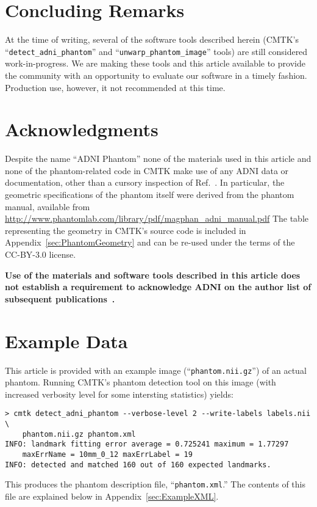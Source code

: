 \documentclass{InsightArticle}
\begin{document}
\section{Concluding Remarks}

At the time of writing, several of the software tools described herein (CMTK's
``\texttt{detect\_adni\_phantom}'' and ``\texttt{unwarp\_phantom\_image}''
tools) are still considered work-in-progress. We are making these tools and
this article available to provide the community with an opportunity to
evaluate our software in a timely fashion. Production use, however, it not
recommended at this time.

\section*{Acknowledgments}

Despite the name ``ADNI Phantom'' none of the materials used in this article
and none of the phantom-related code in CMTK make use of any ADNI data or
documentation, other than a cursory inspection of
Ref.~\cite{GuntBernBoro:2009}. In particular, the geometric specifications of
the phantom itself were derived from the phantom manual, available from
\url{http://www.phantomlab.com/library/pdf/magphan_adni_manual.pdf} The table
representing the geometry in CMTK's source code is included in
Appendix~\ref{sec:PhantomGeometry} and can be re-used under the terms of the
CC-BY-3.0 license.

{\bf Use of the materials and software tools described in this article does not
establish a requirement to acknowledge ADNI on the author list of subsequent
publications~\cite{RohlPoli:2012}.}




\clearpage
\appendix

\section{Example Data}

This article is provided with an example image (``\texttt{phantom.nii.gz}'')
of an actual phantom. Running CMTK's phantom detection tool on this image
(with increased verbosity level for some intersting statistics) yields:
\begin{verbatim}
> cmtk detect_adni_phantom --verbose-level 2 --write-labels labels.nii \
    phantom.nii.gz phantom.xml
INFO: landmark fitting error average = 0.725241 maximum = 1.77297 
    maxErrName = 10mm_0_12 maxErrLabel = 19
INFO: detected and matched 160 out of 160 expected landmarks.
\end{verbatim}
This produces the phantom description file, ``\texttt{phantom.xml}.'' The
contents of this file are explained below in Appendix~\ref{sec:ExampleXML}.
\end{document}
